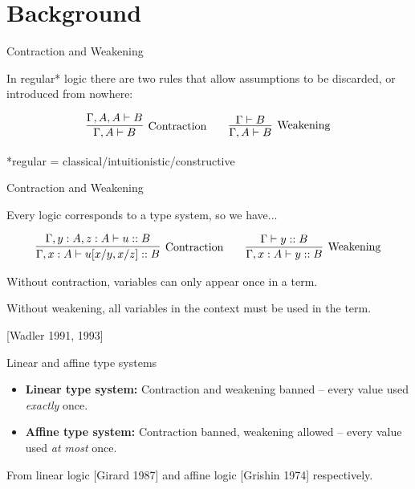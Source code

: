 \documentclass[10pt]{beamer}
\begin{document}
\section{Background}

\begin{frame}{Contraction and Weakening}

In regular* logic there are two rules that allow assumptions to be discarded, or introduced from nowhere:

$$
\infer[\text{Contraction}]{\Gamma, A \vdash B}{
	\Gamma, A, A \vdash B
}
\qquad
\infer[\text{Weakening}]{\Gamma, A \vdash B}{
    \Gamma \vdash B
}
$$

*regular = classical/intuitionistic/constructive

\end{frame}

\begin{frame}{Contraction and Weakening}

Every logic corresponds to a type system, so we have...

\begin{eqnarray*}
\infer[\text{Contraction}]{\Gamma, x : A \vdash u[x/y, x/z] :: B}{
	\Gamma, y : A, z : A \vdash u :: B
}
\qquad
\infer[\text{Weakening}]{\Gamma, x : A \vdash y :: B}{
    \Gamma\vdash y :: B
}
\end{eqnarray*}

Without contraction, variables can only appear once in a term.

Without weakening, all variables in the context must be used in the term.

[Wadler 1991, 1993]

\end{frame}

\begin{frame}{Linear and affine type systems}

\begin{itemize}
\item \textbf{Linear type system:} Contraction and weakening banned -- every value used \textit{exactly} once.
\item \textbf{Affine type system:} Contraction banned, weakening allowed -- every value used \textit{at most} once.
\end{itemize}

From linear logic [Girard 1987] and affine logic [Grishin 1974] respectively.

\end{frame}
\end{document}
